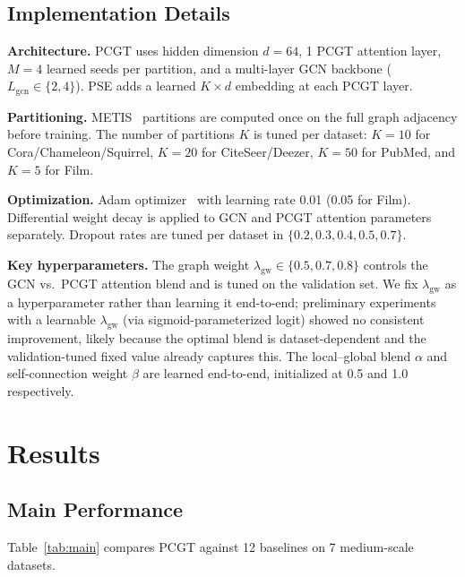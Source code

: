 \documentclass[manuscript, screen, review, anonymous]{acmart}
\begin{document}
\subsection{Implementation Details}

\textbf{Architecture.} PCGT uses hidden dimension $d=64$, 1 PCGT attention layer, $M=4$ learned seeds per partition, and a multi-layer GCN backbone ($L_\text{gcn} \in \{2, 4\}$). PSE adds a learned $K \times d$ embedding at each PCGT layer.

\textbf{Partitioning.} METIS~\cite{karypis1998metis} partitions are computed once on the full graph adjacency before training. The number of partitions $K$ is tuned per dataset: $K=10$ for Cora/Chameleon/Squirrel, $K=20$ for CiteSeer/Deezer, $K=50$ for PubMed, and $K=5$ for Film.

\textbf{Optimization.} Adam optimizer~\cite{kingma2015adam} with learning rate 0.01 (0.05 for Film). Differential weight decay is applied to GCN and PCGT attention parameters separately. Dropout rates are tuned per dataset in $\{0.2, 0.3, 0.4, 0.5, 0.7\}$.

\textbf{Key hyperparameters.} The graph weight $\lambda_{\text{gw}} \in \{0.5, 0.7, 0.8\}$ controls the GCN vs.\ PCGT attention blend and is tuned on the validation set. We fix $\lambda_{\text{gw}}$ as a hyperparameter rather than learning it end-to-end; preliminary experiments with a learnable $\lambda_{\text{gw}}$ (via sigmoid-parameterized logit) showed no consistent improvement, likely because the optimal blend is dataset-dependent and the validation-tuned fixed value already captures this. The local--global blend $\alpha$ and self-connection weight $\beta$ are learned end-to-end, initialized at 0.5 and 1.0 respectively.


\section{Results}
\label{sec:results}

\subsection{Main Performance}

Table~\ref{tab:main} compares PCGT against 12 baselines on 7 medium-scale datasets.
\end{document}
